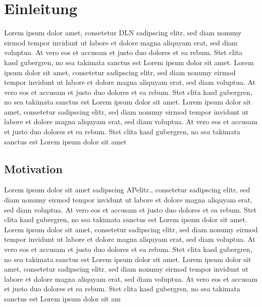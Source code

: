 \chapter{Einleitung}
\label{chap:einleitung}
Lorem ipsum dolor  amet, consetetur \gls{DLN} sadipscing elitr, sed diam nonumy eirmod tempor invidunt ut labore et dolore magna aliquyam erat, sed diam voluptua. At vero eos et accusam et justo duo dolores et ea rebum. Stet clita kasd gubergren, no sea takimata sanctus est Lorem ipsum dolor sit amet. Lorem ipsum dolor sit amet, consetetur sadipscing elitr, sed diam nonumy eirmod tempor invidunt ut labore et dolore magna aliquyam erat, sed diam voluptua. At vero eos et accusam et justo duo dolores et ea rebum. Stet clita kasd gubergren, no sea takimata sanctus est Lorem ipsum dolor sit amet. Lorem ipsum dolor sit amet, consetetur sadipscing elitr, sed diam nonumy eirmod tempor invidunt ut labore et dolore magna aliquyam erat, sed diam voluptua. At vero eos et accusam et justo duo dolores et ea rebum. Stet clita kasd gubergren, no sea takimata sanctus est Lorem ipsum dolor sit amet 
\section{Motivation}
Lorem ipsum dolor sit amet sadipscing \gls{AP}elitr., consetetur sadipscing elitr, sed diam nonumy eirmod tempor invidunt ut labore et dolore magna aliquyam erat, sed diam voluptua. At vero eos et accusam et justo duo dolores et ea rebum. Stet clita kasd gubergren, no sea takimata sanctus est Lorem ipsum dolor sit amet. Lorem ipsum dolor sit amet, consetetur sadipscing elitr, sed diam nonumy eirmod tempor invidunt ut labore et dolore magna aliquyam erat, sed diam voluptua. At vero eos et accusam et justo duo dolores et ea rebum. Stet clita kasd gubergren, no sea takimata sanctus est Lorem ipsum dolor sit amet. Lorem ipsum dolor sit amet, consetetur sadipscing elitr, sed diam nonumy eirmod tempor invidunt ut labore et dolore magna aliquyam erat, sed diam voluptua. At vero eos et accusam et justo duo dolores et ea rebum. Stet clita kasd gubergren, no sea takimata sanctus est Lorem ipsum dolor sit am
